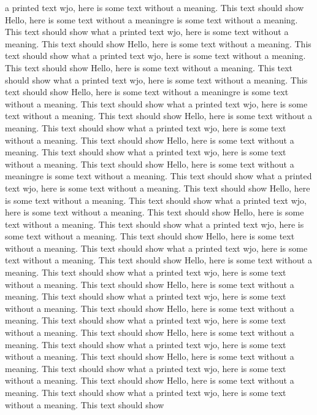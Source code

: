 \documentclass{article}
\begin{document}
\begin{multicols}{3}
a printed text wjo, here is some text without a meaning.  This text should show 
Hello, here is some text without a meaningre is some text without a meaning.  This text should show what 
a printed text wjo, here is some text without a meaning.  This text should show 
Hello, here is some text without a meaning.  This text should show what 
a printed text wjo, here is some text without a meaning.  This text should show 
Hello, here is some text without a meaning.  This text should show what 
a printed text wjo, here is some text without a meaning.  This text should show 
Hello, here is some text without a meaningre is some text without a meaning.  This text should show what 
a printed text wjo, here is some text without a meaning.  This text should show 
Hello, here is some text without a meaning.  This text should show what 
a printed text wjo, here is some text without a meaning.  This text should show 
Hello, here is some text without a meaning.  This text should show what 
a printed text wjo, here is some text without a meaning.  This text should show 
Hello, here is some text without a meaningre is some text without a meaning.  This text should show what 
a printed text wjo, here is some text without a meaning.  This text should show 
Hello, here is some text without a meaning.  This text should show what 
a printed text wjo, here is some text without a meaning.  This text should show 
Hello, here is some text without a meaning.  This text should show what 
a printed text wjo, here is some text without a meaning.  This text should show 
Hello, here is some text without a meaning.  This text should show what 
a printed text wjo, here is some text without a meaning.  This text should show 
Hello, here is some text without a meaning.  This text should show what 
a printed text wjo, here is some text without a meaning.  This text should show 
Hello, here is some text without a meaning.  This text should show what 
a printed text wjo, here is some text without a meaning.  This text should show 
Hello, here is some text without a meaning.  This text should show what 
a printed text wjo, here is some text without a meaning.  This text should show 
Hello, here is some text without a meaning.  This text should show what 
a printed text wjo, here is some text without a meaning.  This text should show 
Hello, here is some text without a meaning.  This text should show what 
a printed text wjo, here is some text without a meaning.  This text should show 
Hello, here is some text without a meaning.  This text should show what 
a printed text wjo, here is some text without a meaning.  This text should show 

\end{multicols}
\end{document}
